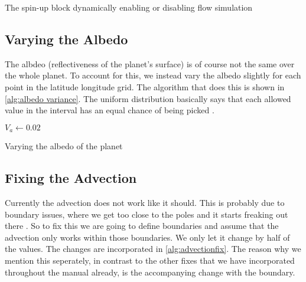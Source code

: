 \begin{algorithm}
    \caption{The spin-up block dynamically enabling or disabling flow simulation}
    \label{alg:spinup}
\end{algorithm}

\subsection{Varying the Albedo}
The albdeo (reflectiveness of the planet's surface) is of course not the same over the whole planet. To account for this, we instead vary the albedo slightly for each point in the latitude 
longitude grid. The algorithm that does this is shown in \autoref{alg:albedo variance}. The uniform distribution basically says that each allowed value in the interval has an equal chance of 
being picked \cite{uniformdist}.

\begin{algorithm}
    $V_a \leftarrow 0.02$ \;
    \caption{Varying the albedo of the planet}
    \label{alg:albedo variance}
\end{algorithm}

\subsection{Fixing the Advection} \label{sec:advectionfix}
Currently the advection does not work like it should. This is probably due to boundary issues, where we get too close to the poles and it starts freaking out there \cite{simon}. So to fix this 
we are going to define boundaries and assume that the advection only works within those boundaries. We only let it change by half of the values. The changes are incorporated in 
\autoref{alg:advectionfix}. The reason why we mention this seperately, in contrast to the other fixes that we have incorporated throughout the manual already, is the accompanying change with the 
boundary. 

